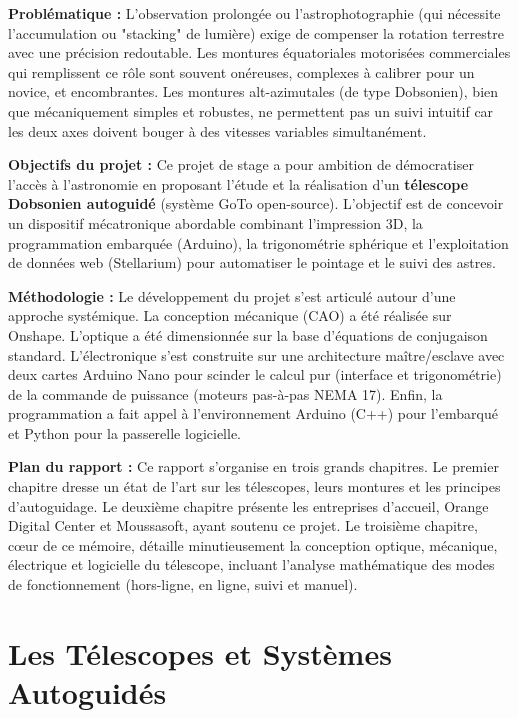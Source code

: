 \documentclass[12pt,a4paper]{report}
\begin{document}
\textbf{Problématique :} L'observation prolongée ou l'astrophotographie (qui nécessite l'accumulation ou "stacking" de lumière) exige de compenser la rotation terrestre avec une précision redoutable. Les montures équatoriales motorisées commerciales qui remplissent ce rôle sont souvent onéreuses, complexes à calibrer pour un novice, et encombrantes. Les montures alt-azimutales (de type Dobsonien), bien que mécaniquement simples et robustes, ne permettent pas un suivi intuitif car les deux axes doivent bouger à des vitesses variables simultanément.

\textbf{Objectifs du projet :} Ce projet de stage a pour ambition de démocratiser l'accès à l'astronomie en proposant l'étude et la réalisation d'un \textbf{télescope Dobsonien autoguidé} (système GoTo open-source). L'objectif est de concevoir un dispositif mécatronique abordable combinant l'impression 3D, la programmation embarquée (Arduino), la trigonométrie sphérique et l'exploitation de données web (Stellarium) pour automatiser le pointage et le suivi des astres.

\textbf{Méthodologie :} Le développement du projet s'est articulé autour d'une approche systémique. La conception mécanique (CAO) a été réalisée sur Onshape. L'optique a été dimensionnée sur la base d'équations de conjugaison standard. L'électronique s'est construite sur une architecture maître/esclave avec deux cartes Arduino Nano pour scinder le calcul pur (interface et trigonométrie) de la commande de puissance (moteurs pas-à-pas NEMA 17). Enfin, la programmation a fait appel à l'environnement Arduino (C++) pour l'embarqué et Python pour la passerelle logicielle.

\textbf{Plan du rapport :} Ce rapport s'organise en trois grands chapitres. Le premier chapitre dresse un état de l'art sur les télescopes, leurs montures et les principes d'autoguidage. Le deuxième chapitre présente les entreprises d'accueil, Orange Digital Center et Moussasoft, ayant soutenu ce projet. Le troisième chapitre, cœur de ce mémoire, détaille minutieusement la conception optique, mécanique, électrique et logicielle du télescope, incluant l'analyse mathématique des modes de fonctionnement (hors-ligne, en ligne, suivi et manuel).

\clearpage

\chapter{Les Télescopes et Systèmes Autoguidés}
\end{document}
